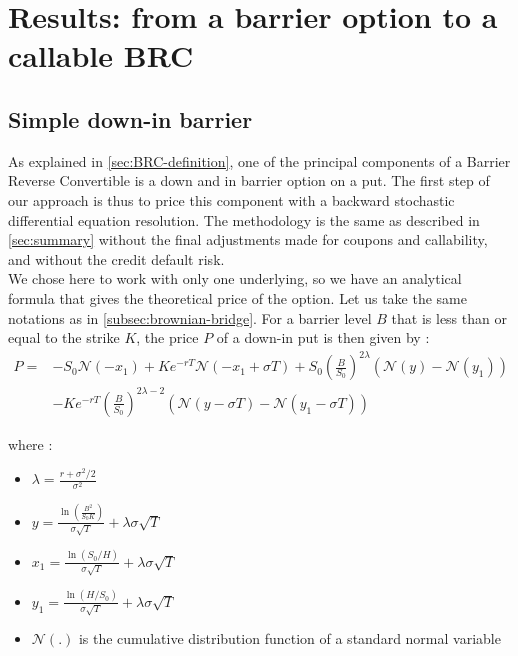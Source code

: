 \documentclass[a4paper,11pt,english]{book}
\begin{document}

\chapter{Results: from a barrier option to a callable BRC}

\section{Simple down-in barrier}
As explained in \ref{sec:BRC-definition}, one of the principal components of a Barrier Reverse Convertible is a down and in barrier option on a put. The first step of our approach is thus to price this component with a backward stochastic differential equation resolution. The methodology is the same as described in \ref{sec:summary} without the final adjustments made for coupons and callability, and without the credit default risk.\\

We chose here to work with only one underlying, so we have an analytical formula that gives the theoretical price of the option. Let us take the same notations as in \ref{subsec:brownian-bridge}. For a barrier level $B$ that is less than or equal to the strike $K$, the price $P$ of a down-in put is then given by \cite{hull2016options}: 
$$\begin{aligned}
P =& -S_{0}\mathcal{N}(-x_{1})+Ke^{-rT}\mathcal{N}(-x_{1}+\sigma T)+S_{0}(\frac{B}{S_{0}})^{2\lambda}(\mathcal{N}(y)-\mathcal{N}(y_{1})) \\
&-Ke^{-rT}(\frac{B}{S_{0}})^{2\lambda-2}(\mathcal{N}(y-\sigma T)-\mathcal{N}(y_{1}-\sigma T))
\end{aligned}$$

where :
\begin{itemize}
    \item $\lambda=\frac{r+\sigma^{2}/2}{\sigma^{2}}$
    \item $y=\frac{\ln(\frac{B^{2}}{S_{0}K})}{\sigma \sqrt{T}}+\lambda \sigma \sqrt{T}$
    \item $x_{1}=\frac{\ln(S_{0}/H)}{\sigma \sqrt{T}}+\lambda \sigma \sqrt{T}$
    \item $y_{1}=\frac{\ln(H/S_{0})}{\sigma \sqrt{T}}+\lambda \sigma \sqrt{T}$
    \item $\mathcal{N}(.)$ is the cumulative distribution function of a standard normal variable
\end{itemize}
\end{document}
